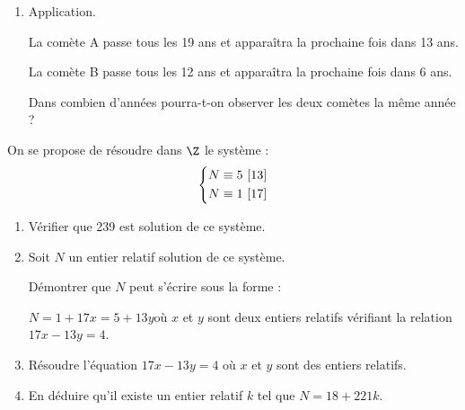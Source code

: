 \begin{colonne*exercice}
\begin{exercice}
\begin{enumerate}
\begin{enumerate}
Démontrer que $n-n_0\equiv0~(228)$.

\item En déduire qu'un entier relatif $n$ appartient à $\mathscr{S}$
  si, et seulement si, $n$ peut s'écrire sous la forme $n=-6+228k$ où
  $k$ est un entier relatif.
\end{enumerate}
\item Application.

  La comète A passe tous les 19 ans et apparaîtra la prochaine fois
  dans 13 ans.

  La comète B passe tous les 12 ans et apparaîtra la prochaine fois
  dans 6 ans.

  Dans combien d'années pourra-t-on observer les deux comètes la même
  année ?
\end{enumerate}
\end{exercice}

\medskip


\begin{exercice}

On se propose de résoudre dans $\Z$ le système : \vspace{-5pt}
$$\left\{\begin{aligned}
N&\equiv5\ [13]\\
N&\equiv 1\ [17]
\end{aligned}\right.\vspace{-5pt}$$

\begin{enumerate}
\item Vérifier que 239 est solution de ce système.
\item Soit $N$ un entier relatif solution de ce système.
		
Démontrer que $N$ peut s'écrire sous la forme : 

$N= 1 + 17x = 5 + 13y$\enskip où $x$ et $y$ sont deux entiers relatifs vérifiant la relation $17x - 13y = 4$.
\item Résoudre l'équation $17x - 13y = 4$ où $x$ et $y$ sont des entiers relatifs.
\item En déduire qu'il existe un entier relatif  $k$ tel que $N = 18 + 221k$.
\end{enumerate}
\end{exercice}



\end{colonne*exercice}
